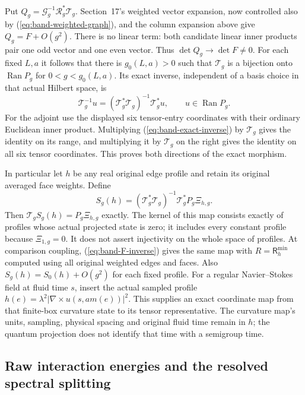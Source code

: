 Put
$Q_g=\mathcal G_g^{-1}\mathcal R_g^*\mathcal T_g$.
Section~17's weighted vector expansion, now controlled also by
(\ref{eq:band-weighted-graph}), and the column expansion above give
$Q_g=F+O(g^2)$. There is no linear term: both candidate linear
inner products pair one odd vector and one even vector. Thus
$\det Q_g\to\det F\ne0$. For each fixed $L,a$ it follows that
there is $g_0(L,a)>0$ such that $\mathcal T_g$ is a bijection
onto $\operatorname{Ran}P_g$ for $0<g<g_0(L,a)$.
Its exact inverse, independent of a basis choice in that actual
Hilbert space, is
\begin{equation}\label{eq:band-exact-inverse}
 \mathcal T_g^{-1}u=(\mathcal T_g^*\mathcal T_g)^{-1}
                              \mathcal T_g^*u,\qquad u\in\operatorname{Ran}P_g.
\end{equation}
For the adjoint use the displayed six tensor-entry coordinates with
their ordinary Euclidean inner product. Multiplying (\ref{eq:band-exact-inverse})
by $\mathcal T_g$ gives the identity on its range, and multiplying
it by $\mathcal T_g$ on the right gives the identity on all six
tensor coordinates. This proves both directions of the exact morphism.

In particular let $h$ be any real original edge profile and retain its
original averaged face weights. Define
\begin{equation}\label{eq:band-h-tensor}
 S_g(h)=(\mathcal T_g^*\mathcal T_g)^{-1}\mathcal T_g^*
                                   P_g\Xi_{h,g}.
\end{equation}
Then $\mathcal T_gS_g(h)=P_g\Xi_{h,g}$ exactly. The kernel of this
map consists exactly of profiles whose actual projected state is zero;
it includes every constant profile because $\Xi_{1,g}=0$.
It does not assert injectivity on the whole space of profiles.
At comparison coupling, (\ref{eq:band-F-inverse}) gives the same map
with $R=\mathsf R_h^{\min}$ computed using all original weighted
edges and faces. Also $S_g(h)=S_0(h)+O(g^2)$ for each fixed profile.
For a regular Navier--Stokes field at fluid time $s$, insert the
actual sampled profile $h(e)=\lambda^2|\nabla\times u(s,a m(e))|^2$.
This supplies an exact coordinate map from that finite-box curvature
state to its tensor representative. The curvature map's units,
sampling, physical spacing and original fluid time remain in $h$;
the quantum projection does not identify that time with a semigroup time.

\subsection{Raw interaction energies and the resolved spectral splitting}

